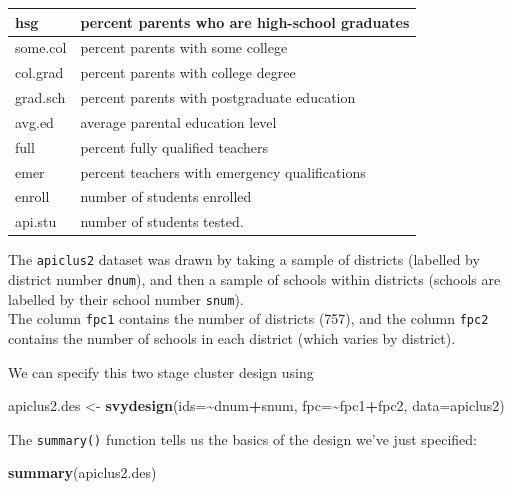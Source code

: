 \documentclass[
]{book}
\newenvironment{Shaded}{\begin{snugshade}}{\end{snugshade}}
\newcommand{\AttributeTok}[1]{\textcolor[rgb]{0.13,0.29,0.53}{#1}}
\newcommand{\FunctionTok}[1]{\textcolor[rgb]{0.13,0.29,0.53}{\textbf{#1}}}
\newcommand{\NormalTok}[1]{#1}
\newcommand{\OtherTok}[1]{\textcolor[rgb]{0.56,0.35,0.01}{#1}}
\newcommand{\SpecialCharTok}[1]{\textcolor[rgb]{0.81,0.36,0.00}{\textbf{#1}}}
\begin{document}
\begin{table}
\begin{tabular}[t]{l|l}
\hline
hsg & percent parents who are high-school graduates\\
\hline
some.col & percent parents with some college\\
\hline
col.grad & percent parents with college degree\\
\hline
grad.sch & percent parents with postgraduate education\\
\hline
avg.ed & average parental education level\\
\hline
full & percent fully qualified teachers\\
\hline
emer & percent teachers with emergency qualifications\\
\hline
enroll & number of students enrolled\\
\hline
api.stu & number of students tested.\\
\hline
\end{tabular}
\end{table}

The \texttt{apiclus2} dataset was drawn by taking a sample of districts (labelled by district number \texttt{dnum}),
and then a sample of schools within districts (schools are labelled by their school number \texttt{snum}).\\
The column \texttt{fpc1} contains the number of districts (757), and the column \texttt{fpc2} contains the
number of schools in each district (which varies by district).

We can specify this two stage cluster design using

\begin{Shaded}
\begin{Highlighting}[]
\NormalTok{apiclus2.des }\OtherTok{\textless{}{-}} \FunctionTok{svydesign}\NormalTok{(}\AttributeTok{ids=}\SpecialCharTok{\textasciitilde{}}\NormalTok{dnum}\SpecialCharTok{+}\NormalTok{snum, }\AttributeTok{fpc=}\SpecialCharTok{\textasciitilde{}}\NormalTok{fpc1}\SpecialCharTok{+}\NormalTok{fpc2, }\AttributeTok{data=}\NormalTok{apiclus2)}
\end{Highlighting}
\end{Shaded}

The \texttt{summary()} function tells us the basics of the design we've just specified:

\begin{Shaded}
\begin{Highlighting}[]
\FunctionTok{summary}\NormalTok{(apiclus2.des)}
\end{Highlighting}
\end{Shaded}
\end{document}
